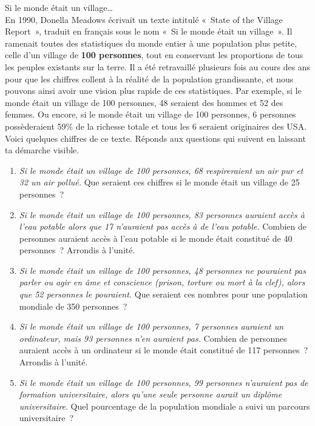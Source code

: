 \documentclass[../../syllabus_1.tex]{subfiles}
\begin{document}
\newpage
\begin{exercise}
  Si le monde était un village\ldots \\
  En 1990,  Donella Meadows écrivait un texte intitulé «~State of the Village Report~», traduit en français sous le nom «~Si le monde était un village~». Il ramenait toutes des statistiques du monde entier à une population plus petite, celle d'un village de \textbf{100 personnes}, tout en conservant les proportions de tous les peuples existants sur la terre. Il a été retravaillé plusieurs fois au cours des ans pour que les chiffres collent à la réalité de la population grandissante, et nous pouvons ainsi avoir une vision plus rapide de ces statistiques. Par exemple, si le monde était un village de 100 personnes, 48 seraient des hommes et 52 des femmes. Ou encore, si le monde était un village de 100 personnes, 6 personnes possèderaient 59\% de la richesse totale et tous les 6 seraient originaires des USA. \\

  Voici quelques chiffres de ce texte. Réponds aux questions qui suivent en laissant ta démarche visible.
  \begin{enumerate}[itemsep=.7cm]
    \item \emph{Si le monde était un village de 100 personnes, 68 respireraient un air pur et 32 un air pollué.} Que seraient ces chiffres si le monde était un village de 25 personnes~?
    \item \emph{Si le monde était un village de 100 personnes, 83 personnes auraient accès à l'eau potable alors que 17 n'auraient pas accès à de l'eau potable.} Combien de personnes auraient accès à l'eau potable si le monde était constitué de 40 personnes~? Arrondis à l'unité.
    \item \emph{Si le monde était un village de 100 personnes, 48 personnes ne pouraient pas parler ou agir en âme et conscience (prison, torture ou mort à la clef), alors que 52 personnes le pouraient.} Que seraient ces nombres pour une population mondiale de 350 personnes~?
    \item \emph{Si le monde était un village de 100 personnes, 7 personnes auraient un ordinateur, mais 93 personnes n'en auraient pas.} Combien de personnes auraient accès à un ordinateur si le monde était constitué de 117 personnes~? Arrondis à l'unité.
    \item \emph{Si le monde était un village de 100 personnes, 99 personnes n'auraient pas de formation universitaire, alors qu'une seule personne aurait un diplôme universitaire}. Quel pourcentage de la population mondiale a suivi un parcours universitaire~?
  \end{enumerate}
\end{exercise}
\end{document}
